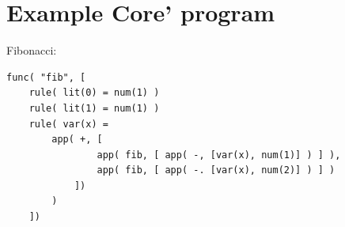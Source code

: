 \section{Example Core' program}

Fibonacci:

\begin{lstlisting}
func( "fib", [
	rule( lit(0) = num(1) )
	rule( lit(1) = num(1) )
	rule( var(x) = 
		app( +, [
				app( fib, [ app( -, [var(x), num(1)] ) ] ), 
				app( fib, [ app( -. [var(x), num(2)] ) ] )
			])
		)
	])
\end{lstlisting}

